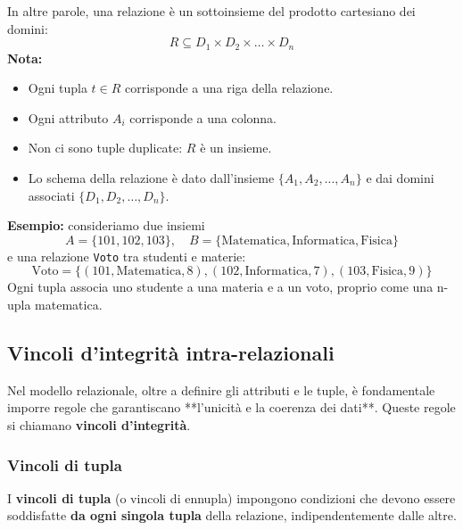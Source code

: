 \documentclass[a4paper,12pt]{article}
\begin{document}
In altre parole, una relazione è un sottoinsieme del prodotto cartesiano dei domini:
\[
R \subseteq D_1 \times D_2 \times \dots \times D_n
\]
\textbf{Nota:}  
\begin{itemize}

    \item Ogni tupla \(t \in R\) corrisponde a una riga della relazione.  

    \item Ogni attributo \(A_i\) corrisponde a una colonna.  

    \item Non ci sono tuple duplicate: \(R\) è un insieme.  

    \item Lo schema della relazione è dato dall'insieme \(\{A_1, A_2, \dots, A_n\}\) e dai domini associati \(\{D_1, D_2, \dots, D_n\}\).
\end{itemize}
\textbf{Esempio:} consideriamo due insiemi
\[
A = \{101, 102, 103\}, \quad B = \{\text{Matematica}, \text{Informatica}, \text{Fisica}\}
\]
e una relazione \texttt{Voto} tra studenti e materie:
\[
\text{Voto} = \{ (101, \text{Matematica}, 8), (102, \text{Informatica}, 7), (103, \text{Fisica}, 9) \}
\]
Ogni tupla associa uno studente a una materia e a un voto, proprio come una n-upla matematica.



\subsection{Vincoli d'integrità intra-relazionali}

Nel modello relazionale, oltre a definire gli attributi e le tuple, è fondamentale imporre regole che garantiscano **l'unicità e la coerenza dei dati**. Queste regole si chiamano \textbf{vincoli d'integrità}.

\subsubsection{Vincoli di tupla}

I \textbf{vincoli di tupla} (o vincoli di ennupla) impongono condizioni che devono essere soddisfatte \textbf{da ogni singola tupla} della relazione, indipendentemente dalle altre.
\end{document}
